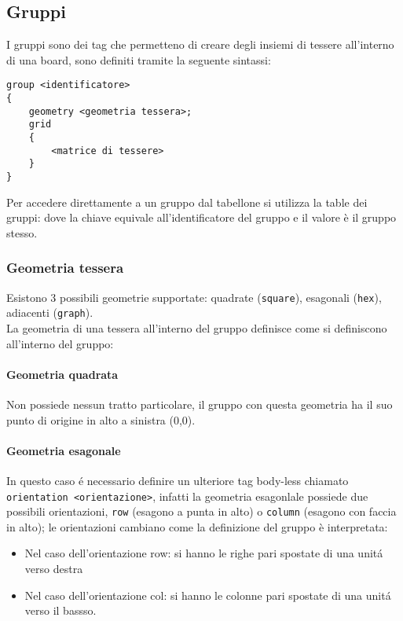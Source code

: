\subsection{Gruppi}
I gruppi sono dei tag che permetteno di creare degli insiemi di tessere all'interno di una board,
sono definiti tramite la seguente sintassi:
\begin{lstlisting}
group <identificatore> 
{
    geometry <geometria tessera>;
    grid 
    {
        <matrice di tessere>
    }
}
\end{lstlisting}
Per accedere direttamente a un gruppo dal tabellone si utilizza la table dei gruppi:
dove la chiave equivale all'identificatore del gruppo e il valore è il gruppo stesso.

\subsubsection{Geometria tessera}
Esistono 3 possibili geometrie supportate: quadrate (\lstinline|square|), 
esagonali (\lstinline|hex|), adiacenti (\lstinline|graph|). \\
La geometria di una tessera all'interno del gruppo definisce come si definiscono all'interno del gruppo: \\

\paragraph{Geometria quadrata}
Non possiede nessun tratto particolare, 
il gruppo con questa geometria ha il suo punto di origine in alto a sinistra (0,0). 

\paragraph{Geometria esagonale}
In questo caso é necessario definire un ulteriore tag body-less chiamato \lstinline|orientation <orientazione>|,
infatti la geometria esagonlale possiede due possibili orientazioni, \lstinline|row| (esagono a punta in alto) 
o \lstinline|column| (esagono con faccia in alto); 
le orientazioni cambiano come la definizione del gruppo è interpretata:
\begin{itemize}
    \item Nel caso dell'orientazione row: si hanno le righe pari spostate di una unitá verso destra
    \item Nel caso dell'orientazione col: si hanno le colonne pari spostate di una unitá verso il bassso.
\end{itemize}

